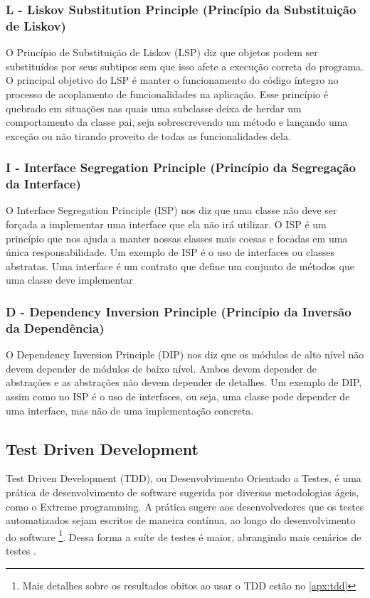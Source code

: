 \documentclass[12pt]{article}
\begin{document}
\subsubsection{L - Liskov Substitution Principle (Princípio da Substituição de Liskov)}
\label{LSP}
O Princípio de Substituição de Liskov (LSP) diz que objetos podem ser substituídos por seus subtipos sem que isso afete a execução correta do programa. O principal objetivo do LSP é manter o funcionamento do código íntegro no processo de acoplamento de funcionalidades na aplicação. Esse princípio é quebrado em situações nas quais uma subclasse deixa de herdar um comportamento da classe pai, seja  sobrescrevendo um método e lançando uma exceção ou não tirando proveito  de todas as funcionalidades dela.

\subsubsection{I - Interface Segregation Principle (Princípio da Segregação da Interface)}
\label{ISP}
O Interface Segregation Principle (ISP) nos diz que uma classe não deve ser forçada a implementar uma interface que ela não irá utilizar. O ISP é um princípio que nos ajuda a manter nossas classes mais coesas e focadas em uma única responsabilidade. Um exemplo de ISP  é o uso de interfaces ou classes abstratas. Uma interface é um contrato que define um conjunto de métodos que uma classe deve implementar

\subsubsection{D - Dependency Inversion Principle (Princípio da Inversão da Dependência)}
\label{DIP}
O Dependency Inversion Principle (DIP) nos diz que os módulos de alto nível não devem depender de módulos de baixo nível. Ambos devem depender de abstrações e as abstrações não devem depender de detalhes. Um exemplo de DIP, assim como no ISP é o uso de interfaces, ou seja, uma classe pode depender de uma interface, mas não de uma implementação concreta.

\subsection{Test Driven Development}
\label{TDD}
Test Driven Development (TDD), ou Desenvolvimento Orientado a Testes, é uma prática de desenvolvimento de software sugerida por diversas metodologias ágeis, como o Extreme programming. A prática sugere aos desenvolvedores que os testes automatizados sejam escritos de maneira contínua, ao longo do desenvolvimento do software \footnote{Mais detalhes sobre os resultados obitos ao usar o TDD estão no \autoref{apx:tdd}}. Dessa forma a suíte de testes é maior, abrangindo mais cenários de testes \cite[Capítulo 8.1]{engsoftware}.
\end{document}

